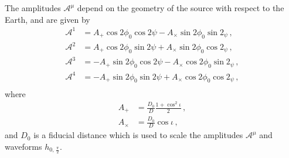\documentclass[aps, prd, twocolumn, superscriptaddress, nofootinbib]{revtex4-1}
\begin{document}
The amplitudes $\mathcal{A}^\mu$ depend on the geometry of the source with respect to the Earth, and are given by
\begin{equation}\label{amplitudes}
\begin{split}
\mathcal{A}^1 &=A_+\cos 2\phi_0\cos 2\psi-A_\times\sin 2 \phi_0\sin 2_\psi \, , \\
\mathcal{A}^2 &=A_+\cos 2\phi_0\sin 2\psi+A_\times\sin 2 \phi_0\cos 2_\psi \, , \\
\mathcal{A}^3 &=-A_+\sin 2\phi_0\cos 2\psi-A_\times\cos 2 \phi_0\sin2_\psi \, , \\
\mathcal{A}^4 &=-A_+\sin 2\phi_0\sin 2\psi+A_\times\cos 2 \phi_0\cos2_\psi \, , \\
\end{split}
\end{equation}
where
\begin{equation}
\begin{split}
A_+&=\frac{D_0}{D}\frac{1+\cos^2 \iota}{2}\, ,\\
A_\times&=\frac{D_0}{D}\cos \iota\, ,
\end{split}
\end{equation}
and $D_0$ is a fiducial distance which is used to scale the amplitudes $\mathcal{A}^\mu$ and waveforms $h_{0,\, \frac{\pi}{2}}$.
\end{document}
